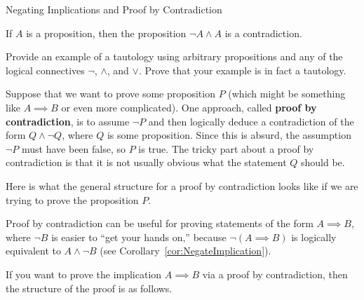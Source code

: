 \begin{section}{Negating Implications and Proof by Contradiction}
\begin{theorem}
If $A$ is a proposition, then the proposition $\neg A\wedge A$ is a contradiction.
\end{theorem}

\begin{problem}
Provide an example of a tautology using arbitrary propositions and any of the logical connectives $\neg$, $\wedge$, and $\vee$.  Prove that your example is in fact a tautology.
\end{problem}

Suppose that we want to prove some proposition $P$ (which might be something like $A\implies B$ or even more complicated).  One approach, called \textbf{proof by contradiction}, is to assume $\neg P$ and then logically deduce a contradiction of the form $Q\wedge \neg Q$, where $Q$ is some proposition.  Since this is absurd, the assumption $\neg P$ must have been false, so $P$ is true.  The tricky part about a proof by contradiction is that it is not usually obvious what the statement $Q$ should be.

\begin{skeleton}
Here is what the general structure for a proof by contradiction looks like if we are trying to prove the proposition $P$.

\begin{center}
\end{center}
\end{skeleton}

Proof by contradiction can be useful for proving statements of the form $A\implies B$, where $\neg B$ is easier to ``get your hands on,'' because $\neg(A \implies B)$ is logically equivalent to $A \wedge \neg B$ (see Corollary~\ref{cor:NegateImplication}).

\begin{skeleton}\label{pf by contradiction for implication}
If you want to prove the implication $A\implies B$ via a proof by contradiction, then the structure of the proof is as follows.


\end{skeleton}
\end{section}
